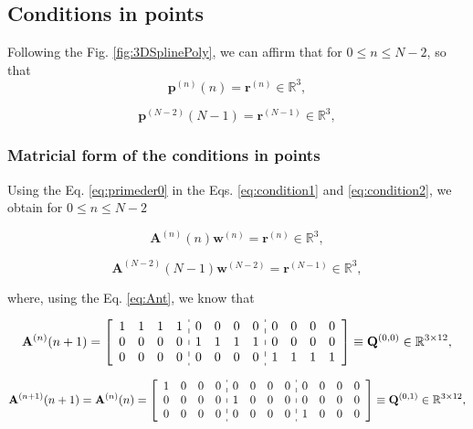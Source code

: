 \subsection{Conditions in points}

Following the Fig. \ref{fig:3DSplinePoly}, 
we can affirm that for $0 \leq n\leq N-2$,
so that
\begin{equation}\label{eq:condition1}
\mathbf{p}^{(n)}(n)=\mathbf{r}^{(n)}
\in \mathbb{R}^{3},
\end{equation}

\begin{equation}\label{eq:condition2}
\mathbf{p}^{(N-2)}(N-1)=\mathbf{r}^{(N-1)}
\in \mathbb{R}^{3},
\end{equation}

\subsubsection{Matricial form of the conditions in points}
Using 
the Eq. \ref{eq:primeder0} in 
the Eqs. \ref{eq:condition1} and \ref{eq:condition2},
we obtain for $0 \leq n\leq N-2$

\begin{equation}\label{eq:pointcond1}
\mathbf{A}^{(n)}(n) \mathbf{w}^{(n)}=\mathbf{r}^{(n)}
\in \mathbb{R}^{3},
\end{equation}

\begin{equation}\label{eq:pointcond2}
\mathbf{A}^{(N-2)}(N-1) \mathbf{w}^{(N-2)}=\mathbf{r}^{(N-1)}
\in \mathbb{R}^{3},
\end{equation}





where, using the Eq. \ref{eq:Ant}, we know that

\begin{equation}\label{eq:Q00}
\mathbf{A}^{(n)}(n+1)=
\left[
\begin{array}{cccc:cccc:cccc}
1 & 1 & 1 & 1 &
0 & 0 & 0 & 0 &
0 & 0 & 0 & 0 \\
0 & 0 & 0 & 0 &
1 & 1 & 1 & 1 &
0 & 0 & 0 & 0 \\
0 & 0 & 0 & 0 &
0 & 0 & 0 & 0 &
1 & 1 & 1 & 1 
\end{array}
\right]
\equiv \mathbf{Q}^{(0,0)}\in \mathbb{R}^{3\times 12},
\end{equation}

\begin{equation}\label{eq:Q01}
\mathbf{A}^{(n+1)}(n+1)
=
\mathbf{A}^{(n)}(n)
=
\left[
\begin{array}{cccc:cccc:cccc}
1 & 0 & 0 & 0 &
0 & 0 & 0 & 0 &
0 & 0 & 0 & 0 \\
0 & 0 & 0 & 0 &
1 & 0 & 0 & 0 &
0 & 0 & 0 & 0 \\
0 & 0 & 0 & 0 &
0 & 0 & 0 & 0 &
1 & 0 & 0 & 0 
\end{array}
\right]
\equiv \mathbf{Q}^{(0,1)}\in \mathbb{R}^{3\times 12},
\end{equation}

